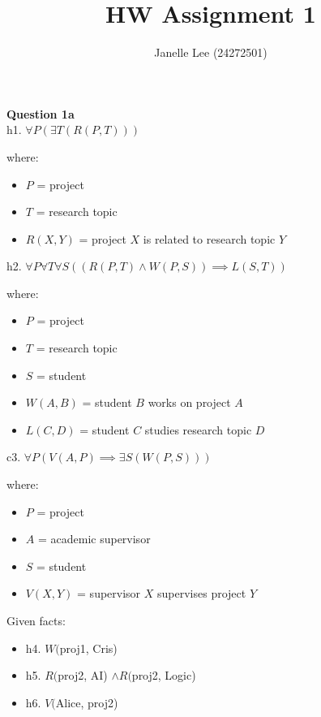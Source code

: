 \documentclass[12pt,a4paper]{article}
\title{HW Assignment 1}
\author{Janelle Lee (24272501)}
\date{}
\begin{document}
\maketitle

\textbf{Question 1a} \\ 

h1. $\forall P (\exists T (R(P, T)))$

where:
\begin{itemize}
    \item $P$ = project
    \item $T$ = research topic
    \item $R(X, Y)$ = project $X$ is related to research topic $Y$
\end{itemize} 

\vspace{1em}

h2. $\forall P \forall T \forall S ((R(P, T) \land W(P, S)) \implies L(S, T))$

where:
\begin{itemize}
    \item $P$ = project
    \item $T$ = research topic
    \item $S$ = student
    \item $W(A, B)$ = student $B$ works on project $A$
    \item $L(C, D)$ = student $C$ studies research topic $D$
\end{itemize}

\vspace{1em}


c3. $\forall P (V(A, P) \implies \exists S (W(P, S)))$

where:
\begin{itemize}
    \item $P$ = project
    \item $A$ = academic supervisor
    \item $S$ = student
    \item $V(X, Y)$ = supervisor $X$ supervises project $Y$
\end{itemize}

\vspace{1em}

Given facts:
\begin{itemize}
    \item h4. $W($proj1, Cris)
    \item h5. $R($proj2, AI) $\land R($proj2, Logic)
    \item h6. $V($Alice, proj2)
\end{itemize}
\end{document}
